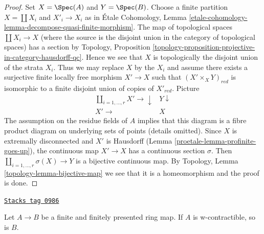 \begin{proof}

Set $X = \Spec(A)$ and $Y = \Spec(B)$. Choose a finite partition
$X = \coprod X_i$ and $X'_i \to X_i$ as in
\'Etale Cohomology, Lemma
\ref{etale-cohomology-lemma-decompose-quasi-finite-morphism}.
The map of topological spaces $\coprod X_i \to X$ (where the source
is the disjoint union in the category of topological spaces)
has a section by Topology, Proposition
\ref{topology-proposition-projective-in-category-hausdorff-qc}.
Hence we see that $X$ is topologically the disjoint union of the
strata $X_i$. Thus we may replace $X$ by the $X_i$ and assume there
exists a surjective finite locally free morphism $X' \to X$ such that
$(X' \times_X Y)_{red}$ is isomorphic to a finite disjoint union of
copies of $X'_{red}$. Picture
$$
\begin{array}{cc}\coprod_{i = 1, \ldots, r} X' \longrightarrow\downarrow & Y \downarrow \\ X' \longrightarrow & X\end{array}
$$
The assumption on the residue fields of $A$ implies that
this diagram is a fibre product diagram on underlying sets
of points (details omitted).
Since $X$ is extremally disconnected and $X'$ is Hausdorff
(Lemma \ref{proetale-lemma-profinite-goes-up}), the continuous map
$X' \to X$ has a continuous section $\sigma$. Then
$\coprod_{i = 1, \ldots, r} \sigma(X) \to Y$ is a bijective
continuous map. By
Topology, Lemma \ref{topology-lemma-bijective-map}
we see that it is a homeomorphism and the proof is done.
\end{proof}

\begin{lemma}
\label{proetale-lemma-finite-finitely-presented-over-w-contractible}
\href{https://stacks.math.columbia.edu/tag/0986}{\texttt{Stacks tag 0986}}

Let $A \to B$ be a finite and finitely presented ring map.
If $A$ is w-contractible, so is $B$.
\end{lemma}

